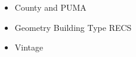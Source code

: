 \begin{itemize}
\item County and PUMA
\item Geometry Building Type RECS
\item Vintage
\end{itemize}
